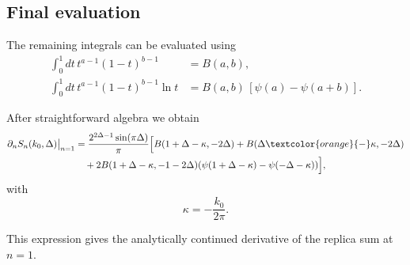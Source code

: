 \documentclass[11pt]{article}
\newcommand{\JM}[1]{\textcolor{orange}{#1}}
\begin{document}
\subsection{Final evaluation}

The remaining integrals can be evaluated using
\begin{align}
\int_0^1 dt\, t^{a-1}(1-t)^{b-1}&=B(a,b),\\
\int_0^1 dt\, t^{a-1}(1-t)^{b-1}\ln t
&=B(a,b)\,[\psi(a)-\psi(a+b)].
\end{align}

After straightforward algebra we obtain
\begin{equation}
\begin{aligned}
\partial_n S_n(k_0,\Delta)\big|_{n=1}
&=
\frac{2^{2\Delta-1}\sin(\pi\Delta)}{\pi}
\Big[
B(1+\Delta-\kappa,-2\Delta)
+
B(\Delta\JM{-}\kappa,-2\Delta)
\\
&\quad
+ 2
B(1+\Delta-\kappa,-1-2\Delta)
(\psi(1+\Delta-\kappa)-\psi(-\Delta-\kappa))\Big],
\end{aligned}
\end{equation}
with
\begin{equation}
\kappa=-\frac{k_0}{2\pi}.
\end{equation}

This expression gives the analytically continued derivative of the replica
sum at $n=1$.
\end{document}

